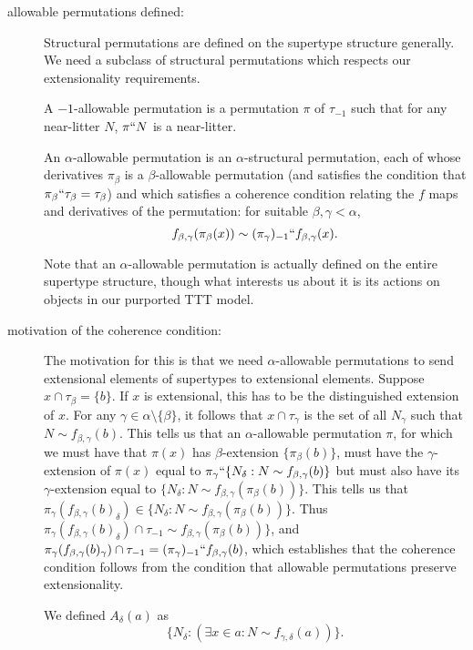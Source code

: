 \documentclass[112pt]{article}
\begin{document}
\begin{description}
\item[allowable permutations defined:]  Structural permutations are defined on the supertype structure generally.  We need a subclass of structural permutations which respects our extensionality requirements.

A $-1$-allowable permutation is a permutation $\pi$ of $\tau_{-1}$ such that for any near-litter $N$, $\pi``N$ is a near-litter.

An $\alpha$-allowable permutation is an $\alpha$-structural permutation, each of whose derivatives $\pi_\beta$ is a $\beta$-allowable permutation (and satisfies the condition that $\pi_\beta``\tau_\beta = \tau_\beta$) and which satisfies a coherence condition relating the $f$ maps and derivatives of the permutation:  for suitable $\beta,\gamma<\alpha$, $$f_{\beta,\gamma}(\pi_\beta(x)) \sim (\pi_\gamma)_{-1}``f_{\beta,\gamma}(x).$$

Note that an $\alpha$-allowable permutation is actually defined on the entire supertype structure, though what interests us about it is its actions on objects in our purported TTT model.

\item[motivation of the coherence condition:]  The motivation for this is that we need $\alpha$-allowable permutations to send extensional elements of supertypes to extensional elements.  Suppose
$x \cap \tau_\beta = \{b\}$.  If $x$ is extensional, this has to be the distinguished extension of $x$.  For any $\gamma \in \alpha \setminus \{\beta\}$,
it follows that $x \cap \tau_\gamma$ is the set of all $N_\gamma$ such that $N \sim f_{\beta,\gamma}(b)$.  This tells us that an $\alpha$-allowable permutation $\pi$, for which we must have that $\pi(x)$ has $\beta$-extension $\{\pi_\beta(b)\}$, must have the  $\gamma$-extension of $\pi(x)$ equal to $\pi_\gamma``\{N_\delta:N \sim f_{\beta,\gamma}(b)\}$
but must also have its $\gamma$-extension equal to $\{N_\delta:N \sim f_{\beta,\gamma}(\pi_\beta(b))\}$.  This tells us that $\pi_\gamma(f_{\beta,\gamma}(b)_\delta) \in \{N_\delta:N \sim f_{\beta,\gamma}(\pi_\beta(b))\}$.  Thus $\pi_\gamma(f_{\beta,\gamma}(b)_\delta)\cap \tau_{-1} \sim f_{\beta,\gamma}(\pi_\beta(b))\}$, and $\pi_\gamma(f_{\beta,\gamma}(b)_\gamma)\cap \tau_{-1} = (\pi_\gamma)_{-1}``f_{\beta,\gamma}(b)$, which establishes that the coherence condition follows from the condition that allowable permutations preserve extensionality.

We defined $A_\delta(a)$ as $$\{N_\delta:(\exists x \in a:N \sim f_{\gamma,\delta}(a))\}.$$


\end{description}
\end{document}
